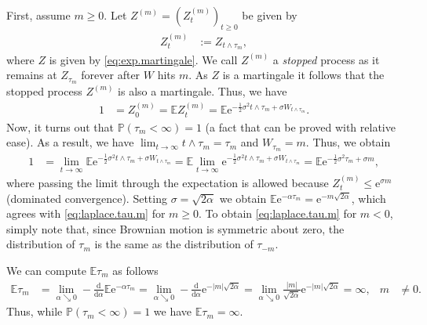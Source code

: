 \documentclass[12pt]{book}
\numberwithin{equation}{chapter}
\theoremstyle{plain}
\numberwithin{theorem}{section}
\theoremstyle{definition}
\numberwithin{exercise}{chapter}
\let\oldendproof\endproof
\renewenvironment{proof}[1][\proofname]{%
  \oldproof[\scshape\underline{#1}]%
}{\oldendproof}
\newcommand{\<}{\langle}
\renewcommand{\>}{\rangle}
\renewcommand{\(}{\left(}
\renewcommand{\)}{\right)}
\renewcommand{\[}{\left[}
\renewcommand{\]}{\right]}
\newcommand\Eb{\mathds{E}}
\newcommand\Pb{\mathds{P}}
\newcommand\sig{\sigma}
\newcommand\dd{\mathrm{d}}
\newcommand\ee{\mathrm{e}}
\begin{document}
\begin{proof}
First, assume $m \geq 0$.
Let $Z^{(m)} = (Z_t^{(m)})_{t \geq 0}$ be given by
\begin{align}
Z_t^{(m)}
	&:=	Z_{t \wedge \tau_m} ,
\end{align}
where $Z$ is given by \eqref{eq:exp.martingale}.
We call $Z^{(m)}$ a \emph{stopped} process as it remains at $Z_{\tau_m}$ forever after $W$ hits $m$.
As $Z$ is a martingale it follows that the stopped process $Z^{(m)}$ is also a martingale.
Thus, we have
\begin{align}
1
	&=	Z_0^{(m)}
	=		\Eb Z_t^{(m)}
	=		\Eb \ee^{ -\tfrac{1}{2} \sig^2 t \wedge \tau_m + \sig W_{t \wedge \tau_m} } .
\end{align}
Now, it turns out that $\Pb( \tau_m < \infty) = 1$ (a fact that can be proved with relative ease).  
As a result, we have $\lim_{t \to \infty} t \wedge \tau_m = \tau_m$ and $W_{\tau_m}=m$.  Thus, we obtain
\begin{align}
1
	&=	\lim_{t \to \infty} \Eb \ee^{ -\tfrac{1}{2} \sig^2 t \wedge \tau_m + \sig W_{t \wedge \tau_m} }
	=		\Eb \lim_{t \to \infty} \ee^{ -\tfrac{1}{2} \sig^2 t \wedge \tau_m + \sig W_{t \wedge \tau_m} }
	=		\Eb \ee^{ -\tfrac{1}{2} \sig^2 \tau_m + \sig m } ,
\end{align}
where passing the limit through the expectation is allowed because $Z_t^{(m)} \leq \ee^{\sig m}$ (dominated convergence).
Setting $\sig = \sqrt{2 \alpha}$ we obtain $\Eb \ee^{- \alpha \tau_m} =	\ee^{- m\sqrt{2 \alpha} }$, which agrees with \eqref{eq:laplace.tau.m} for $m \geq 0$.  To obtain \eqref{eq:laplace.tau.m} for $m<0$, simply note that, since Brownian motion is symmetric about zero, the distribution of $\tau_m$ is the same as the distribution of $\tau_{-m}$.
\end{proof}

\noindent
We can compute $\Eb \tau_m$ as follows
\begin{align}
\Eb \tau_m
	&=	\lim_{\alpha \searrow 0} -\frac{\dd}{\dd \alpha} \Eb \ee^{- \alpha \tau_m}
	=		\lim_{\alpha \searrow 0} -\frac{\dd}{\dd \alpha} \ee^{- |m|\sqrt{2 \alpha} } 
	=		\lim_{\alpha \searrow 0} \frac{|m|}{\sqrt{2 \alpha}} \ee^{- |m|\sqrt{2 \alpha} }
	=		\infty , &
m
	&\neq 0 .
\end{align}
Thus, while $\Pb( \tau_m < \infty) = 1$ we have $\Eb \tau_m = \infty$.
\end{document}
